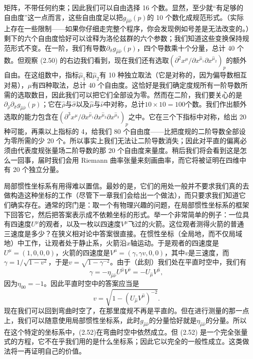 矩阵，不带任何约束；因此我们可以自由选择 16 个数。显然，至少就“有足够的自由度”这一点而言，这些自由度足以把$g_{\hat\mu\hat\nu}(p)$的 10 个数化成规范形式。（实际上存在一些限制——如果你仔细走完整个程序，你会发现例如号差是无法改变的。）剩下的六个自由度恰好可以诠释为洛伦兹群的六个参数；我们知道这些变换保持规范形式不变。在一阶，我们有导数$\partial_{\hat\sigma}g_{\hat\mu\hat\nu}(p)$，四个导数乘十个分量，总计 40 个数。但观察 (2.50) 的右边我们看到，现在我们还有选取$\left(\partial^2 x^\mu/\partial x^{\hat\mu_1}\partial x^{\hat\mu_2}\right)_p$的额外自由。在这组数中，指标$\hat\mu_1$和$\hat\mu_2$有 10 种独立取法（它是对称的，因为偏导数相互对易），$\mu$有四种取法，总计 40 个自由度。这恰好是我们确定度规所有一阶导数所需的选取数目，因此我们可以把它们全部设为零。然而在二阶，我们要关心的是$\partial_{\hat\rho}\partial_{\hat\sigma}g_{\hat\mu\hat\nu}(p)$；它在$\hat\rho$与$\hat\sigma$以及$\hat\mu$与$\hat\nu$中对称，总计$10\times10=100$个数。我们作出额外选取的能力包含在$\left(\partial^3 x^\mu/\partial x^{\hat\mu_1}\partial x^{\hat\mu_2}\partial x^{\hat\mu_3}\right)_p$之中。它在三个下指标中对称，给出 20 种可能，再乘以上指标的 4，给我们 80 个自由度——比把度规的二阶导数全部设为零所需的少 20 个。所以事实上我们无法让二阶导数消失；因此对平直的偏离必须由代表度规张量场二阶导数的那 20 个自由度来量度。稍后我们将会看到这是怎么一回事，届时我们会用 Riemann 曲率张量来刻画曲率，而它将被证明在四维中有 20 个独立分量。

局部惯性坐标系有用得难以置信。最妙的是，它们的用处一般并不要求我们真的去做构造这种坐标的工作（尽管下一章我们会给出一个做法），而只要求我们知道它们确实存在。通常的窍门是：取一个有物理兴趣的问题，在局部惯性坐标系的框架下回答它，然后把答案表示成不依赖坐标的形式。举一个非常简单的例子：一位具有四速度$U^\mu$的观者，以及一枚以四速度$V^\mu$飞过的火箭。这位观者测得火箭的普通三速度是多少？在狭义相对论中答案很直接。在惯性坐标（全局地，而不仅局域地）中工作，让观者处于静止系，火箭沿$x$轴运动。于是观者的四速度是$U^\mu=(1,0,0,0)$，火箭的四速度是$V^\mu=(\gamma,\gamma v,0,0)$，其中$v$是三速度，而$\gamma=1/\sqrt{1-v^2}$，于是$v=\sqrt{1-\gamma^{-2}}$。由于（此刻）我们处在平直时空中，我们有
\begin{equation*}
\gamma=-\eta_{\hat\mu\hat\nu}U^{\hat\mu}V^{\hat\nu}=-U_{\hat\mu}V^{\hat\mu},
\tag{2.51}
\end{equation*}
因为$\eta_{00}=-1$。因此平直时空中的答案应当是
\begin{equation*}
v=\sqrt{1-\left(U_{\hat\mu}V^{\hat\mu}\right)^{-2}}.
\tag{2.52}
\end{equation*}
现在我们可以回到弯曲时空了，在那里度规不再是平直的。但在进行测量的那一点上，我们可以随意使用局部惯性坐标系，此时$g_{\hat\mu\hat\nu}$的分量恰好就是$\eta_{\hat\mu\hat\nu}$的分量。所以在这个特定的坐标系中，(2.52)在弯曲时空中依然成立。但 (2.52) 是一个完全张量式的方程，它不在乎我们用的是什么坐标系；因此它以完全的一般性成立。这类做法将一再证明自己的价值。

